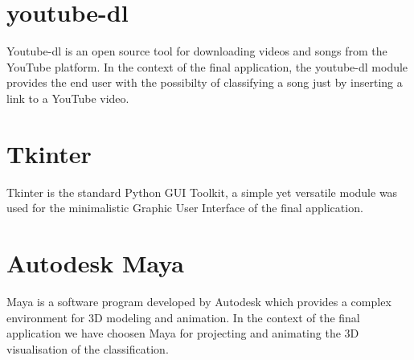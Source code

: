 \section{youtube-dl}
Youtube-dl is an open source tool for downloading videos and songs from the YouTube platform. In the
context of the final application, the youtube-dl module provides the end user with the possibilty of classifying
a song just by inserting a link to a YouTube video.

\section{Tkinter}
Tkinter is the standard Python GUI Toolkit, a simple yet versatile module was used for the minimalistic Graphic
User Interface of the final application.

\section{Autodesk Maya}
Maya is a software program developed by Autodesk which provides a complex environment
for 3D modeling and animation. In the context of the final application we have choosen Maya for projecting and
animating the 3D visualisation of the classification.
